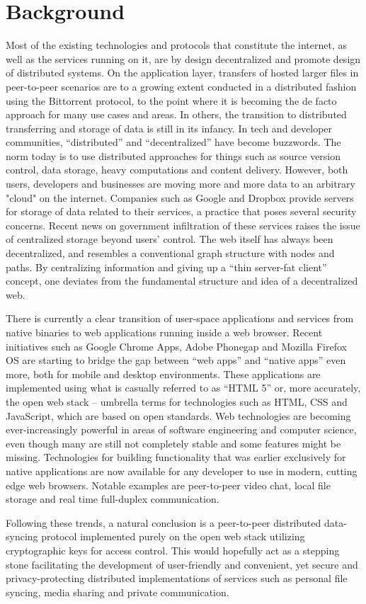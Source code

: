 \section{Background}
Most of the existing technologies and protocols that constitute the internet, as well as the services running on it, are by design decentralized and promote design of distributed systems. On the application layer, transfers of hosted larger files in peer-to-peer scenarios are to a growing extent conducted in a distributed fashion using the Bittorrent protocol, to the point where it is becoming the de facto approach for many use cases and areas. In others, the transition to distributed transferring and storage of data is still in its infancy. In tech and developer communities, “distributed” and “decentralized” have become buzzwords. The norm today is to use distributed approaches for things such as source version control, data storage, heavy computations and content delivery.
However, both users, developers and businesses are moving more and more data to an arbitrary "cloud" on the internet. Companies such as Google and Dropbox provide servers for storage of data related to their services, a practice that poses several security concerns. Recent news on government infiltration of these services raises the issue of centralized storage beyond users’ control. The web itself has always been decentralized, and resembles a conventional graph structure with nodes and paths. By centralizing information and giving up a “thin server-fat client” concept, one deviates from the fundamental structure and idea of a decentralized web.

There is currently a clear transition of user-space applications and services from native binaries to web applications running inside a web browser. Recent initiatives such as Google Chrome Apps, Adobe Phonegap and Mozilla Firefox OS are starting to bridge the gap between “web apps” and “native apps” even more, both for mobile and desktop environments. These applications are implemented using what is casually referred to as “HTML 5” or, more accurately, the open web stack – umbrella terms for technologies such as HTML, CSS and JavaScript, which are based on open standards. Web technologies are becoming ever-increasingly powerful in areas of software engineering and computer science, even though many are still not completely stable and some features might be missing. Technologies for building functionality that was earlier exclusively for native applications are now available for any developer to use in modern, cutting edge web browsers. Notable examples are peer-to-peer video chat, local file storage and real time full-duplex communication.

Following these trends, a natural conclusion is a peer-to-peer distributed data-syncing protocol implemented purely on the open web stack utilizing cryptographic keys for access control. This would hopefully act as a stepping stone facilitating the development of user-friendly and convenient, yet secure and privacy-protecting distributed implementations of services such as personal file syncing, media sharing and private communication.
